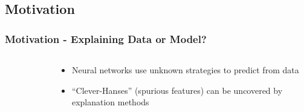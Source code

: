 \documentclass[German, aspectratio=169]{beamer}
\begin{document}
\subsection{Motivation}
\begin{frame}[t]
    \frametitle{Motivation - Explaining Data or Model?}
    \vspace{-0.5cm}
    \begin{columns}[t]
        \begin{column}[t]{0.4\textwidth}
            \begin{figure}
                \centering
            \end{figure}
        \end{column}
        \begin{column}{0.6\textwidth}
            \begin{itemize}
                \item Neural networks use unknown strategies to predict from data
                      \pause
                \item ``Clever-Hanses'' (spurious features) can be uncovered by explanation methods

\end{itemize}
\end{column}
\end{columns}
\end{frame}
\end{document}
